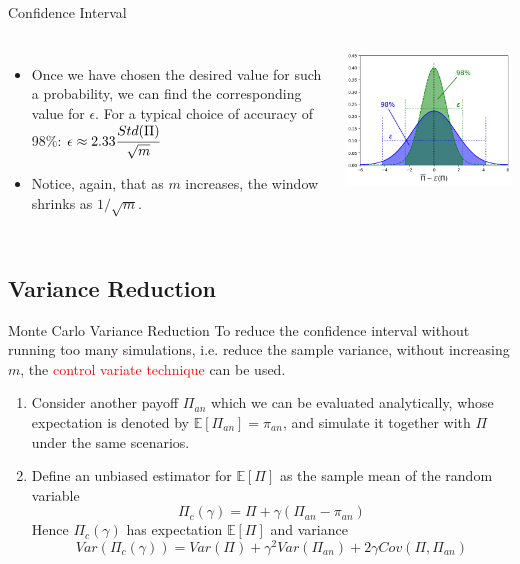 \documentclass{beamer}
\begin{document}
\begin{frame}{Confidence Interval}
  \begin{columns}
    \begin{itemize}
    \item Once we have chosen the desired value for such a probability, we can find the corresponding value for $\epsilon$. For a typical choice of accuracy of 98\%: $\epsilon \approx 2.33 \cfrac{Std(\Pi)}{\sqrt{m}}$
    \item Notice, again, that as $m$ increases, the window shrinks as $1/\sqrt{m}$.
    \end{itemize}
    \includegraphics[width=0.9\linewidth]{confidence_interval}
  \end{columns}
\end{frame}

\subsection{Variance Reduction}
\begin{frame}{Monte Carlo Variance Reduction}
  To reduce the confidence interval without running too many simulations, i.e. reduce the sample variance, without increasing $m$, the \textcolor{red}{control variate technique} can be used.
  \pause
  \begin{enumerate}
  \item<2-> Consider another payoff $\Pi_{an}$ which we can be evaluated analytically, whose expectation is denoted by $\mathbb{E}[\Pi_{an}] = \pi_{an}$, and simulate it together with $\Pi$ under the same scenarios.%
  \item<3-> Define an unbiased estimator for $\mathbb{E}[\Pi]$ as the sample mean of the random variable 
    \begin{equation*}
      \Pi_c(\gamma) = \Pi + \gamma(\Pi_{an} - \pi_{an})
    \end{equation*}
    Hence $\Pi_c(\gamma)$ has expectation $\mathbb{E}[\Pi]$ and variance
    \begin{equation*}
      Var(\Pi_c(\gamma)) = Var(\Pi) + \gamma^2 Var(\Pi_{an}) + 2\gamma Cov(\Pi, \Pi_{an})
    \end{equation*}
  \end{enumerate}
\end{frame}
\end{document}
